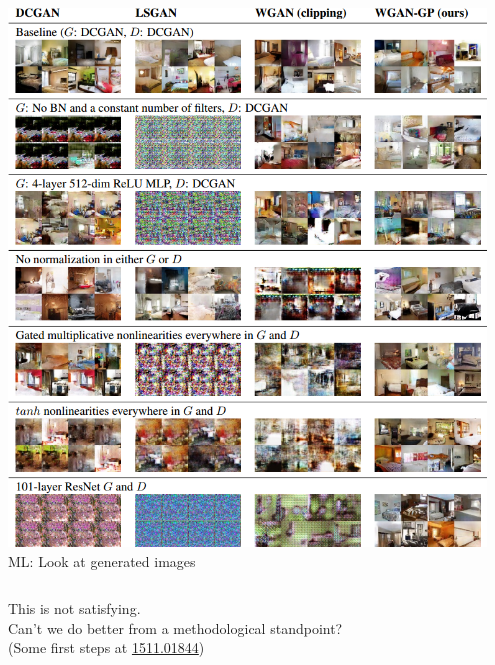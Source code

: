 \documentclass{beamer}
\begin{document}
\begin{frame}
\begin{columns}
\begin{column}{0.5\textwidth}
\begin{center}
                \includegraphics[width=0.95\textwidth]{figures/wgan.png}\\
                \scriptsize ML: Look at generated images
            \end{center}
        \end{column}
    \end{columns}

    \begin{center}
        {\color{red}This is not satisfying.} \\
        Can't we do better from a methodological standpoint?\\
        {\scriptsize (Some first steps at \href{https://arxiv.org/abs/1511.01844}{1511.01844})}
    \end{center}

\end{frame}


\end{document}
